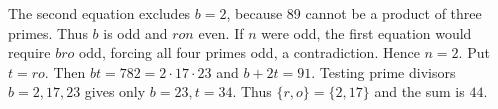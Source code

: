 The second equation excludes $b=2$, because 89 cannot be a product of three primes. Thus $b$ is odd and $ron$ even. If $n$ were odd, the first equation would require $bro$ odd, forcing all four primes odd, a contradiction. Hence $n=2$. Put $t=ro$. Then $bt=782=2\cdot17\cdot23$ and $b+2t=91$. Testing prime divisors $b=2,17,23$ gives only $b=23,t=34$. Thus $\{r,o\}=\{2,17\}$ and the sum is $\boxed{44}$.
